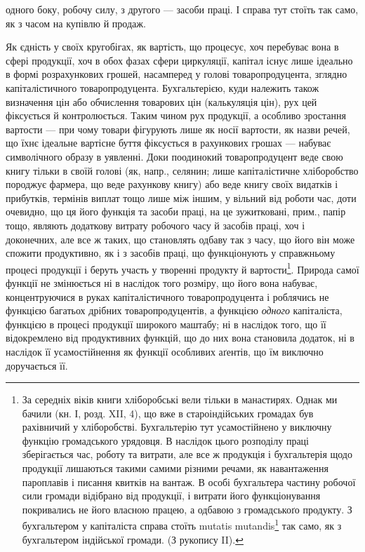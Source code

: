\parcont{}  %
одного боку, робочу силу, з другого — засоби праці. І справа тут стоїть
так само, як з часом на купівлю й продаж.

Як єдність у своїх кругобігах, як вартість, що процесує, хоч перебуває
вона в сфері продукції, хоч в обох фазах сфери циркуляції, капітал
існує лише ідеально в формі розрахункових грошей, насамперед у голові
товаропродуцента, зглядно капіталістичного товаропродуцента. Бухгальтерією,
куди належить також визначення цін або обчислення товарових
цін (калькуляція цін), рух цей фіксується й контролюється. Таким
чином рух продукції, а особливо зростання вартости — при чому товари
фігурують лише як носії вартости, як назви речей, що їхнє ідеальне
вартісне буття фіксується в рахункових грошах — набуває символічного
образу в уявленні. Доки поодинокий товаропродуцент веде свою книгу
тільки в своїй голові (як, напр., селянин; лише капіталістичне хліборобство
породжує фармера, що веде рахункову книгу) або веде книгу своїх
видатків і прибутків, термінів виплат тощо лише між іншим, у вільний від
роботи час, доти очевидно, що ця його функція та засоби праці, на це
зужитковані, прим., папір тощо, являють додаткову витрату робочого часу
й засобів праці, хоч і доконечних, але все ж таких, що становлять одбаву
так з часу, що його він може спожити продуктивно, як і з засобів праці, що
функціонують у справжньому процесі продукції і беруть участь у творенні
продукту й вартости\footnote{
За середніх віків книги хліборобські вели тільки в манастирях.
\label{original-89}Однак ми
бачили (кн. І, розд. XII, 4), що вже в староіндійських громадах був рахівничий
у хліборобстві. Бухгальтерію тут усамостійнено у виключну функцію громадського
урядовця. В наслідок цього розподілу праці зберігається час, роботу та
витрати, але все ж продукція і бухгальтерія щодо продукції лишаються
такими самими різними речами, як навантаження пароплавів і писання квитків на
вантаж. В особі бухгальтера частину робочої сили громади відібрано від
продукції, і витрати його функціонування покривались не його власною
працею, а одбавою з громадськоґо продукту. З бухгальтером у капіталіста
справа стоїть mutatis mutandis\footnote*{
Змінивши те, що треба змінити, або з відповідними змінами. 
} так само, як з бухгальтером індійської громади. (З рукопису II).
}. Природа самої функції не змінюється ні в наслідок
того розміру, що його вона набуває, концентруючися в руках капіталістичного
товаропродуцента і роблячись не функцією багатьох дрібних товаропродуцентів,
а функцією \emph{одного} капіталіста, функцією в процесі продукції
широкого маштабу; ні в наслідок того, що її відокремлено від продуктивних
функцій, що до них вона становила додаток, ні в наслідок її усамостійнення
як функції особливих аґентів, що їм виключно доручається її.

